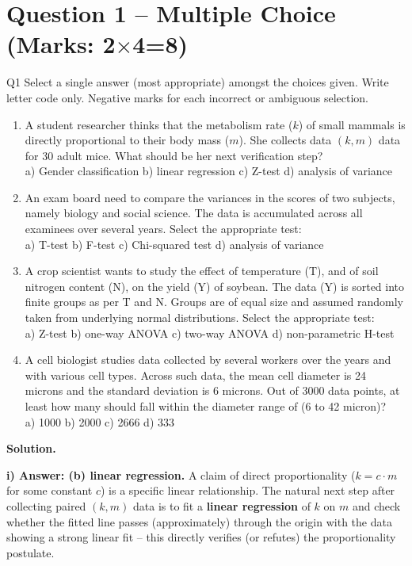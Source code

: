 \documentclass[11pt]{article}
\newcommand{\soln}{\par\noindent\textcolor{acolor}{\textbf{Solution.}}\quad}
\begin{document}
\section{Question 1 -- Multiple Choice (Marks: 2$\times$4=8)}
\begin{question}{Q1}
Select a single answer (most appropriate) amongst the choices given. Write letter code only. Negative marks for each incorrect or ambiguous selection.

\begin{enumerate}[label=\roman*)]
\item A student researcher thinks that the metabolism rate ($k$) of small mammals is directly proportional to their body mass ($m$). She collects data $(k,m)$ data for 30 adult mice. What should be her next verification step? \\
a) Gender classification \quad b) linear regression \quad c) Z-test \quad d) analysis of variance

\item An exam board need to compare the variances in the scores of two subjects, namely biology and social science. The data is accumulated across all examinees over several years. Select the appropriate test: \\
a) T-test \quad b) F-test \quad c) Chi-squared test \quad d) analysis of variance

\item A crop scientist wants to study the effect of temperature (T), and of soil nitrogen content (N), on the yield (Y) of soybean. The data (Y) is sorted into finite groups as per T and N. Groups are of equal size and assumed randomly taken from underlying normal distributions. Select the appropriate test: \\
a) Z-test \quad b) one-way ANOVA \quad c) two-way ANOVA \quad d) non-parametric H-test

\item A cell biologist studies data collected by several workers over the years and with various cell types. Across such data, the mean cell diameter is 24 microns and the standard deviation is 6 microns. Out of 3000 data points, at least how many should fall within the diameter range of (6 to 42 micron)? \\
a) 1000 \quad b) 2000 \quad c) 2666 \quad d) 333
\end{enumerate}
\end{question}

\soln

\textbf{i) Answer: (b) linear regression.}
A claim of direct proportionality ($k = c\cdot m$ for some constant $c$) is a specific linear relationship. The natural next step after collecting paired $(k,m)$ data is to fit a \textbf{linear regression} of $k$ on $m$ and check whether the fitted line passes (approximately) through the origin with the data showing a strong linear fit -- this directly verifies (or refutes) the proportionality postulate.
\end{document}
